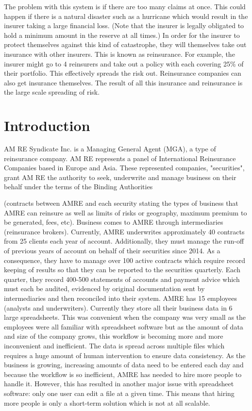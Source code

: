 \documentclass[12pt]{article}
\begin{document}
The problem with this system is if there are too many claims at once. This could happen if there is a natural disaster such as a hurricane which would result in the insurer taking a large financial loss. (Note that the insurer is legally obligated to hold a minimum amount in the reserve at all times.) In order for the insurer to protect themselves against this kind of catastrophe, they will themselves take out insurance with other insurers. This is known as reinsurance. For example, the insurer might go to 4 reinsurers and take out a policy with each covering 25\% of their portfolio. This effectively spreads the risk out. Reinsurance companies can also get insurance themselves. The result of all this insurance and reinsurance is the large scale spreading of risk.


\section{Introduction}
AM RE Syndicate Inc.\cite{amre} is a Managing General Agent (MGA), a type of reinsurance company. AM RE represents a panel of International Reinsurance Companies based in Europe and Asia. These represented companies, "securities", grant AM RE the authority to seek, underwrite and manage business on their behalf under the terms of the Binding Authorities

(contracts between AMRE and each security stating the types of business that AMRE can reinsure as well as limits of risks or geography, maximum premium to be
generated, fees, etc). Business comes to AMRE through intermediaries (reinsurance brokers).
Currently, AMRE underwrites approximately 40 contracts from 25 clients each year of account.
Additionally, they must manage the run-off of previous years of account on behalf of their securities
since 2014. As a consequence, they have to manage over 100 active contracts which require record
keeping of results so that they can be reported to the securities quarterly. Each quarter, they record
400-500 statements of accounts and payment advice which must each be audited, evidenced by
original documentation sent by intermediaries and then reconciled into their system. AMRE has 15
employees (analysts and underwriters).
Currently they store all their business data in 6 large spreadsheets. This was convenient when the
company was very small as the employees were all familiar with spreadsheet software but as the
amount of data and size of the company grows, this workflow is becoming more and more
inconvenient and inefficient.
The data is spread across multiple files which requires a huge amount of human intervention to
ensure data consistency. As the business is growing, increasing amounts of data need to be entered
each day and because the workflow is so inefficient, AMRE has needed to hire more people to
handle it. However, this has resulted in another major issue with spreadsheet software: only one
user can edit a file at a given time. This means that hiring more people is only a short-term solution
which is not at all scalable.
\end{document}
